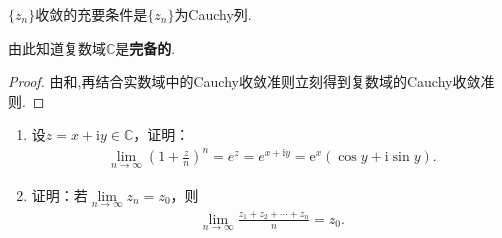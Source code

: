 \documentclass[../../main.tex]{subfiles}%
\begin{document}
\begin{theorem}[复数域的Cauchy收敛准则]\label{theorem:复数域的Cauchy收敛准则}
\(\{ z_n \}\)收敛的充要条件是\(\{ z_n \}\)为Cauchy列.
\end{theorem}
\begin{note}
由此知道复数域\(\mathbb{C}\)是\textbf{完备的}.
\end{note}
\begin{proof}

由和,再结合实数域中的Cauchy收敛准则立刻得到复数域的Cauchy收敛准则.

\end{proof}

\begin{proposition}\label{proposition:复变版本的经典极限和Cacuhy命题}
\begin{enumerate}[(1)]
\item\label{proposition:复变版本的经典极限和Cacuhy命题-1} 设$z = x + \mathrm{i}y \in \mathbb{C}$，证明：
\begin{align*}
\lim\limits_{n \to \infty} \left(1 + \frac{z}{n}\right)^n = e^z = e^{x+\text{i}y} = \mathrm{e}^x (\cos y + \mathrm{i}\sin y).
\end{align*}

\item\label{proposition:复变版本的经典极限和Cacuhy命题-2} 证明：若$\lim\limits_{n \to \infty} z_n = z_0$，则
\begin{align*}
\lim\limits_{n \to \infty} \frac{z_1 + z_2 + \cdots + z_n}{n} = z_0.
\end{align*}
\end{enumerate}
\end{proposition}
\end{document}
